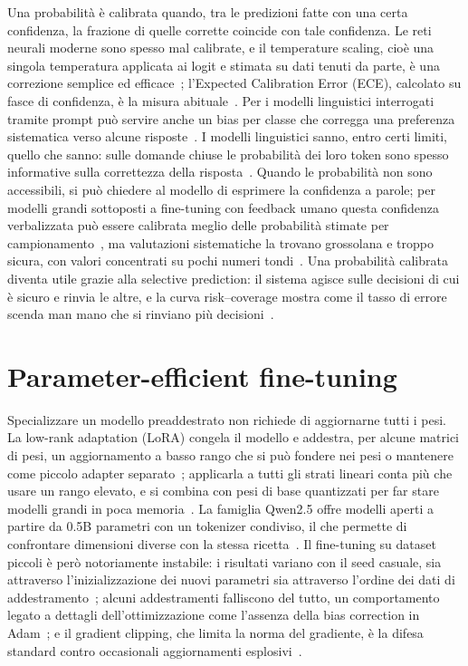Una probabilità è calibrata quando, tra le predizioni fatte con una certa confidenza, la frazione di quelle corrette
coincide con tale confidenza. Le reti neurali moderne sono spesso mal calibrate, e il temperature scaling, cioè una
singola temperatura applicata ai logit e stimata su dati tenuti da parte, è una correzione semplice ed
efficace~\cite{guo2017calibration}; l'Expected Calibration Error (ECE), calcolato su fasce di confidenza, è la misura
abituale~\cite{naeini2015ece}. Per i modelli linguistici interrogati tramite prompt può servire anche un bias per classe
che corregga una preferenza sistematica verso alcune risposte~\cite{zhao2021calibrate}. I modelli linguistici sanno, entro
certi limiti, quello che sanno: sulle domande chiuse le probabilità dei loro token sono spesso informative sulla
correttezza della risposta~\cite{kadavath2022know}. Quando le probabilità non sono accessibili, si può chiedere al modello
di esprimere la confidenza a parole; per modelli grandi sottoposti a fine-tuning con feedback umano questa confidenza
verbalizzata può essere calibrata meglio delle probabilità stimate per campionamento~\cite{tian2023justask}, ma
valutazioni sistematiche la trovano grossolana e troppo sicura, con valori concentrati su pochi numeri
tondi~\cite{xiong2024uncertainty}. Una probabilità calibrata diventa utile grazie alla selective prediction: il sistema
agisce sulle decisioni di cui è sicuro e rinvia le altre, e la curva risk--coverage mostra come il tasso di errore scenda
man mano che si rinviano più decisioni~\cite{geifman2017selective}.

\section{Parameter-efficient fine-tuning}
\label{sec:bg-peft}

Specializzare un modello preaddestrato non richiede di aggiornarne tutti i pesi. La low-rank adaptation (LoRA) congela il
modello e addestra, per alcune matrici di pesi, un aggiornamento a basso rango che si può fondere nei pesi o mantenere
come piccolo adapter separato~\cite{hu2022lora}; applicarla a tutti gli strati lineari conta più che usare un rango
elevato, e si combina con pesi di base quantizzati per far stare modelli grandi in poca memoria~\cite{dettmers2023qlora}.
La famiglia Qwen2.5 offre modelli aperti a partire da 0.5B parametri con un tokenizer condiviso, il che permette di
confrontare dimensioni diverse con la stessa ricetta~\cite{qwen2024qwen25}. Il fine-tuning su dataset piccoli è però
notoriamente instabile: i risultati variano con il seed casuale, sia attraverso l'inizializzazione dei nuovi parametri sia
attraverso l'ordine dei dati di addestramento~\cite{dodge2020finetuning}; alcuni addestramenti falliscono del tutto, un
comportamento legato a dettagli dell'ottimizzazione come l'assenza della bias correction in
Adam~\cite{mosbach2021stability}; e il gradient clipping, che limita la norma del gradiente, è la difesa standard contro
occasionali aggiornamenti esplosivi~\cite{pascanu2013difficulty}.

